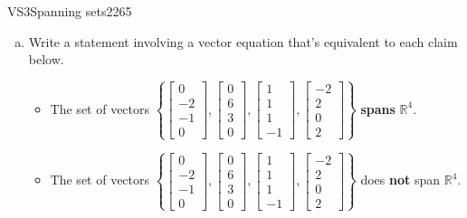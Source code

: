 \begin{exercise}{VS3}{Spanning sets}{2265} 
\begin{exerciseStatement} 

\begin{enumerate}[(a)]
\item  

 Write a statement involving a vector equation that's equivalent to each claim below. 

 

\begin{itemize}
\item  

 The set of vectors \(\left\{ \left[\begin{array}{c}
0 \\
-2 \\
-1 \\
0
\end{array}\right] , \left[\begin{array}{c}
0 \\
6 \\
3 \\
0
\end{array}\right] , \left[\begin{array}{c}
1 \\
1 \\
1 \\
-1
\end{array}\right] , \left[\begin{array}{c}
-2 \\
2 \\
0 \\
2
\end{array}\right] \right\}\) \textbf{spans} \(\mathbb R^4\). 

 
\item  

 The set of vectors \(\left\{ \left[\begin{array}{c}
0 \\
-2 \\
-1 \\
0
\end{array}\right] , \left[\begin{array}{c}
0 \\
6 \\
3 \\
0
\end{array}\right] , \left[\begin{array}{c}
1 \\
1 \\
1 \\
-1
\end{array}\right] , \left[\begin{array}{c}
-2 \\
2 \\
0 \\
2
\end{array}\right] \right\}\) does \textbf{not} span \(\mathbb R^4\). 


\end{itemize}
\end{enumerate}
\end{exerciseStatement}
\end{exercise}
